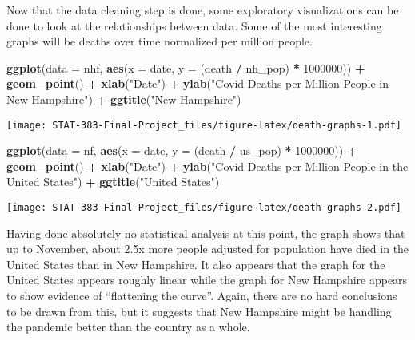 \documentclass[
]{article}
\newenvironment{Shaded}{\begin{snugshade}}{\end{snugshade}}
\newcommand{\DataTypeTok}[1]{\textcolor[rgb]{0.13,0.29,0.53}{#1}}
\newcommand{\DecValTok}[1]{\textcolor[rgb]{0.00,0.00,0.81}{#1}}
\newcommand{\KeywordTok}[1]{\textcolor[rgb]{0.13,0.29,0.53}{\textbf{#1}}}
\newcommand{\NormalTok}[1]{#1}
\newcommand{\OperatorTok}[1]{\textcolor[rgb]{0.81,0.36,0.00}{\textbf{#1}}}
\newcommand{\StringTok}[1]{\textcolor[rgb]{0.31,0.60,0.02}{#1}}
\begin{document}
Now that the data cleaning step is done, some exploratory visualizations
can be done to look at the relationships between data. Some of the most
interesting graphs will be deaths over time normalized per million
people.

\begin{Shaded}
\begin{Highlighting}[]
\KeywordTok{ggplot}\NormalTok{(}\DataTypeTok{data =}\NormalTok{ nhf, }\KeywordTok{aes}\NormalTok{(}\DataTypeTok{x =}\NormalTok{ date, }\DataTypeTok{y =}\NormalTok{ (death }\OperatorTok{/}\StringTok{ }\NormalTok{nh_pop) }\OperatorTok{*}\StringTok{ }\DecValTok{1000000}\NormalTok{)) }\OperatorTok{+}\StringTok{ }\KeywordTok{geom_point}\NormalTok{() }\OperatorTok{+}\StringTok{ }\KeywordTok{xlab}\NormalTok{(}\StringTok{"Date"}\NormalTok{) }\OperatorTok{+}\StringTok{ }\KeywordTok{ylab}\NormalTok{(}\StringTok{"Covid Deaths per Million People in New Hampshire"}\NormalTok{) }\OperatorTok{+}\StringTok{ }\KeywordTok{ggtitle}\NormalTok{(}\StringTok{"New Hampshire"}\NormalTok{)}
\end{Highlighting}
\end{Shaded}

\texttt{[image: STAT-383-Final-Project\_files/figure-latex/death-graphs-1.pdf]}

\begin{Shaded}
\begin{Highlighting}[]
\KeywordTok{ggplot}\NormalTok{(}\DataTypeTok{data =}\NormalTok{ nf, }\KeywordTok{aes}\NormalTok{(}\DataTypeTok{x =}\NormalTok{ date, }\DataTypeTok{y =}\NormalTok{ (death }\OperatorTok{/}\StringTok{ }\NormalTok{us_pop) }\OperatorTok{*}\StringTok{ }\DecValTok{1000000}\NormalTok{)) }\OperatorTok{+}\StringTok{ }\KeywordTok{geom_point}\NormalTok{() }\OperatorTok{+}\StringTok{ }\KeywordTok{xlab}\NormalTok{(}\StringTok{"Date"}\NormalTok{) }\OperatorTok{+}\StringTok{ }\KeywordTok{ylab}\NormalTok{(}\StringTok{"Covid Deaths per Million People in the United States"}\NormalTok{) }\OperatorTok{+}\StringTok{ }\KeywordTok{ggtitle}\NormalTok{(}\StringTok{"United States"}\NormalTok{)}
\end{Highlighting}
\end{Shaded}

\texttt{[image: STAT-383-Final-Project\_files/figure-latex/death-graphs-2.pdf]}

Having done absolutely no statistical analysis at this point, the graph
shows that up to November, about 2.5x more people adjusted for
population have died in the United States than in New Hampshire. It also
appears that the graph for the United States appears roughly linear
while the graph for New Hampshire appears to show evidence of
``flattening the curve''. Again, there are no hard conclusions to be
drawn from this, but it suggests that New Hampshire might be handling
the pandemic better than the country as a whole.
\end{document}
